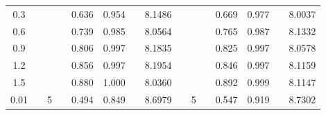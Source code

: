 \documentclass[12pt]{article}
\begin{document}
\begin{table}[!ht]
\begin{threeparttable}
\begin{tabular}{clllcllclllcclc}
0.3                                               &  &                               &  & 0.636                        & 0.954                                           &  & 8.1486                                                                    &  &                               &  & 0.669                                  & 0.977                                 &  & 8.0037                                                                    \\
0.6                                               &  &                               &  & 0.739                        & 0.985                                           &  & 8.0564                                                                    &  &                               &  & 0.765                                  & 0.987                                 &  & 8.1332                                                                    \\
0.9                                               &  &                               &  & 0.806                        & 0.997                                           &  & 8.1835                                                                    &  &                               &  & 0.825                                  & 0.997                                 &  & 8.0578                                                                    \\
1.2                                               &  &                               &  & 0.856                        & 0.997                                           &  & 8.1954                                                                    &  &                               &  & 0.846                                  & 0.997                                 &  & 8.1159                                                                    \\
1.5                                               &  &                               &  & 0.880                         & 1.000                                             &  & 8.0360                                                                     &  &                               &  & 0.892                                  & 0.999                                 &  & 8.1147                                                                    \\ \midrule
0.01                                              &  & 5                             &  & 0.494                        & 0.849                                           &  & 8.6979                                                                    &  & 5                             &  & 0.547                                  & 0.919                                 &  & 8.7302                                                                    \\

\end{tabular}
\end{threeparttable}
\end{table}
\end{document}
